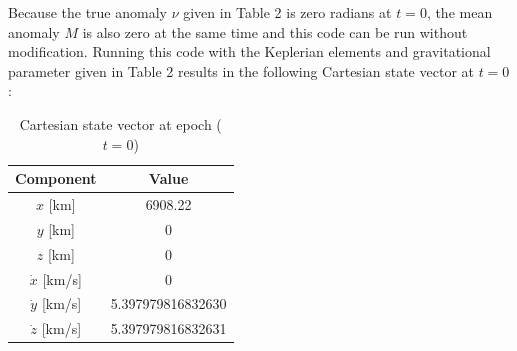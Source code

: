 \documentclass[titlepage]{article}
\begin{document}
\begin{mdframed}[linewidth=1pt, innertopmargin=10pt, innerbottommargin=10pt]
	Because the true anomaly $\nu$ given in Table 2 is zero radians at $t=0$, the mean anomaly $M$ is also zero at the same time and this code can be run without modification. Running this code with the Keplerian elements and gravitational parameter given in Table 2 results in the following Cartesian state vector at $t=0$:
	\begin{table}[H]
		\centering
		\caption{Cartesian state vector at epoch ($t=0$)}
		\label{tab:cartesian_state}
		\begin{tabular}{|c|c|}
			\hline
			Component & Value \\
			\hline
			$x$ [km] & 6908.22 \\
			\hline
			$y$ [km] & 0 \\
			\hline
			$z$ [km] & 0 \\
			\hline
			$\dot{x}$ [km/s] & 0 \\
			\hline
			$\dot{y}$ [km/s] & 5.397979816832630 \\
			\hline
			$\dot{z}$ [km/s] & 5.397979816832631 \\
			\hline
		\end{tabular}
	\end{table}
\end{mdframed}
\end{document}
